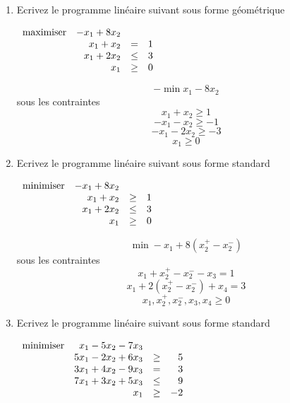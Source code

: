 \begin{enumerate}


  \item Ecrivez  le programme linéaire suivant sous forme géométrique

    $
    \begin{array}{lrcr}
      \mbox{maximiser} & -x_1 + 8 x_2 \\
      & x_1 + x_2 & = & 1\\
      & x_1 + 2x_2 & \leq & 3\\
      & x_1 & \geq & 0
    \end{array}
    $

    \begin{solution}
      $$ -\min x_{1}-8x_{2}$$
      sous les contraintes
      $$ x_{1} + x_{2} \geq 1$$
      $$ -x_{1} - x_{2} \geq -1$$
      $$ -x_{1} - 2x_{2} \geq -3$$
      $$ x_{1} \geq 0$$
    \end{solution}


  \item Ecrivez  le programme linéaire suivant sous forme standard

    $
    \begin{array}{lrcr}
      \mbox{minimiser} & -x_1 + 8 x_2 \\
      & x_1 + x_2 & \geq & 1\\
      & x_1 + 2x_2 & \leq & 3\\
      & x_1 & \geq & 0
    \end{array}
    $

    \begin{solution}
      $$\min -x_{1} + 8(x_{2}^{+} - x_{2}^{-})$$
      sous les contraintes
      $$x_{1} + x_{2}^{+} - x_{2}^{-} - x_{3} = 1$$
      $$x_{1} + 2(x_{2}^{+} - x_{2}^{-}) + x_{4} = 3$$
      $$x_{1},x_{2}^{+},x_{2}^{-},x_{3}, x_{4} \geq 0$$
    \end{solution}


  \item Ecrivez  le programme linéaire suivant sous forme standard

    $
    \begin{array}{lrcr}
      \mbox{minimiser} & x_1-5x_2-7x_3\\
      & 5x_1-2x_2+6x_3  & \geq & 5\\
      &3x_1+4x_2-9x_3 & = & 3\\
      &7x_1+3x_2+ 5x_3 & \leq & 9\\
      & x_1  & \geq & -2\\
    \end{array}
    $


\end{enumerate}
